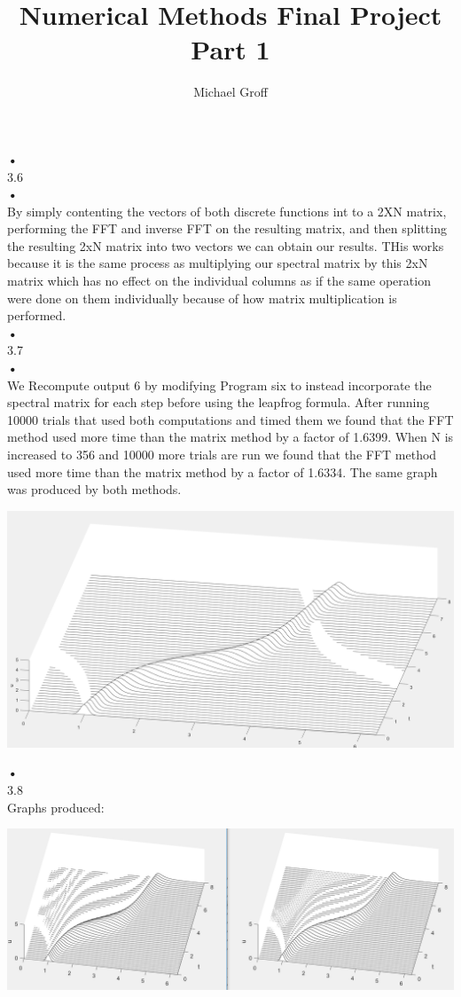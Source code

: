 \documentclass[12pt]{article}
\begin{document}
\title{Numerical Methods Final Project Part 1}
\author{Michael Groff}
\maketitle
\textbf{•} \\
3.6 \\
\textbf{•} \\
By simply contenting the vectors of both discrete functions int to a 2XN matrix, performing the FFT and inverse FFT on the resulting matrix, and then splitting the resulting 2xN matrix into two vectors we can obtain our results. THis works because it is the same process as multiplying our spectral matrix by this 2xN matrix which has no effect on the individual columns as if the same operation were done on them individually because of how matrix multiplication is performed. \\
\textbf{•}\\
3.7 \\
\textbf{•}\\
We Recompute output 6 by modifying Program six to instead incorporate the spectral matrix for each step before using the leapfrog formula. After running 10000 trials that used both computations and timed them we found that the FFT method used more time than the matrix method by a factor of 1.6399. When N is increased to 356 and 10000 more trials are run we found that the FFT method used more time than the matrix method by a factor of 1.6334. The same graph was produced by both methods.\\
\begin{center}
\includegraphics[scale=0.35]{3_77}
\end{center}
\textbf{•}\\
3.8 \\
Graphs produced:
\begin{center}
\includegraphics[scale=0.55]{3_7}
\end{center}
\end{document}
